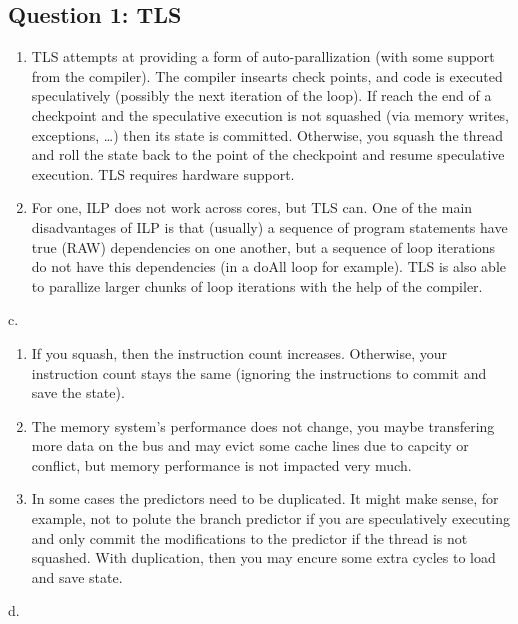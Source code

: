 \subsection{Question 1: TLS}

\begin{enumerate}
\def\labelenumi{\alph{enumi}.}
\item
  TLS attempts at providing a form of auto-parallization (with some
  support from the compiler). The compiler insearts check points, and
  code is executed speculatively (possibly the next iteration of the
  loop). If reach the end of a checkpoint and the speculative execution
  is not squashed (via memory writes, exceptions, \ldots{}) then its
  state is committed. Otherwise, you squash the thread and roll the
  state back to the point of the checkpoint and resume speculative
  execution. TLS requires hardware support.
\item
  For one, ILP does not work across cores, but TLS can. One of the main
  disadvantages of ILP is that (usually) a sequence of program
  statements have true (RAW) dependencies on one another, but a sequence
  of loop iterations do not have this dependencies (in a doAll loop for
  example). TLS is also able to parallize larger chunks of loop
  iterations with the help of the compiler.
\end{enumerate}

c.

\begin{enumerate}
\def\labelenumi{\arabic{enumi}.}
\item
  If you squash, then the instruction count increases. Otherwise, your
  instruction count stays the same (ignoring the instructions to commit
  and save the state).
\item
  The memory system's performance does not change, you maybe transfering
  more data on the bus and may evict some cache lines due to capcity or
  conflict, but memory performance is not impacted very much.
\item
  In some cases the predictors need to be duplicated. It might make
  sense, for example, not to polute the branch predictor if you are
  speculatively executing and only commit the modifications to the
  predictor if the thread is not squashed. With duplication, then you
  may encure some extra cycles to load and save state.
\end{enumerate}

d.

